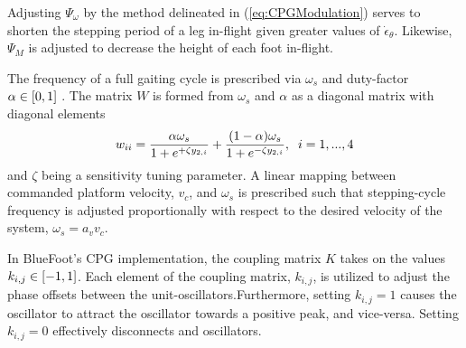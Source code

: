 			Adjusting $\Psi_{\omega}$ by the method delineated in (\ref{eq:CPGModulation}) serves to shorten the stepping period of a leg in-flight given greater values of $\dot{\epsilon}_{\theta}$. Likewise, $\Psi_{M}$ is adjusted to decrease the height of each foot in-flight. 

			The frequency of a full gaiting cycle is prescribed via $\omega_{s}$ and duty-factor $\alpha \in \left[0,1\right]$ \cite{Matos2010}. The matrix $W$ is formed from  $\omega_{s}$ and $\alpha$ as a diagonal matrix with diagonal elements 
				\begin{equation}
						w_{ii} = 	{ 
								   	\frac{\alpha \omega_{s}}{	1+e^{+\zeta y_{2,i}}	}	+
									\frac{(1-	\alpha)\omega_{s}}{	1+e^{-\zeta y_{2,i}}	} 
								}, \hspace{2mm} i = 1,...,4 	
					\label{eq::CPGMatrices}
				\end{equation}
			and $\zeta$ being a sensitivity tuning parameter. A linear mapping between commanded platform velocity, $v_{c}$, and $\omega_{s}$ is prescribed such that stepping-cycle frequency is adjusted proportionally with respect to the desired velocity of the system, \IE $\omega_{s} = a_{v}v_{c}$.

			In BlueFoot's CPG implementation, the coupling matrix $K$ takes on the values $k_{i,j} \in \left[-1,1\right]$. Each element of the coupling matrix, $k_{i,j}$, is utilized to adjust the phase offsets between the unit-oscillators.Furthermore, setting $k_{i,j}=1$ causes the \Jth oscillator to attract the \Ith oscillator  towards a  positive peak, and vice-versa. Setting $k_{i,j}=0$ effectively disconnects \Ith and \Jth oscillators. 

